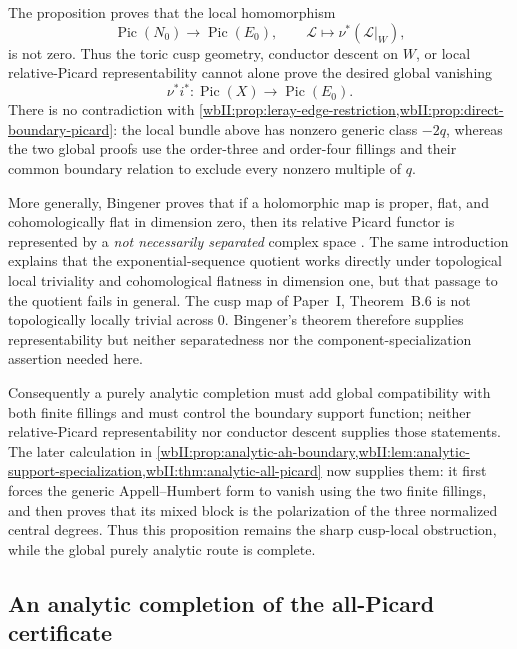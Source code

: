 \begin{remark}
\label{wbII:rem:local-cusp-picard-obstruction}
The proposition proves that the local homomorphism
\[
 \operatorname{Pic}(N_0)\longrightarrow\operatorname{Pic}(E_0),
 \qquad
 \mathcal L\longmapsto\nu^*(\mathcal L|_W),
\]
is not zero.  Thus the toric cusp geometry, conductor descent on \(W\),
or local relative-Picard representability cannot alone prove the desired
global vanishing
\[
 \nu^*i^*:\operatorname{Pic}(X)\longrightarrow
 \operatorname{Pic}(E_0).
\]
There is no contradiction with
\cref{wbII:prop:leray-edge-restriction,wbII:prop:direct-boundary-picard}: the local
bundle above has nonzero generic class \(-2q\), whereas the two global
proofs use the order-three and order-four fillings and their common
boundary relation to exclude every nonzero multiple of \(q\).

More generally, Bingener proves that if a holomorphic map is proper,
flat, and cohomologically flat in dimension zero, then its relative
Picard functor is represented by a \emph{not necessarily separated}
complex space
\cite[Introduction, p.~318; Satz~6.2, pp.~336--337]{Bingener1980}.
The same introduction explains that the exponential-sequence quotient
works directly under topological local triviality and cohomological
flatness in dimension one, but that passage to the quotient fails in
general.  The cusp map of Paper~I, Theorem~B.6 is not
topologically locally trivial across \(0\).  Bingener's theorem therefore
supplies representability but neither separatedness nor the
component-specialization assertion needed here.

Consequently a purely analytic completion must add global compatibility
with both finite fillings and must control the boundary support function;
neither relative-Picard representability nor conductor descent supplies
those statements.  The later calculation in
\cref{wbII:prop:analytic-ah-boundary,wbII:lem:analytic-support-specialization,wbII:thm:analytic-all-picard} now supplies them: it first forces the generic
Appell--Humbert form to vanish using the two finite fillings, and then
proves that its mixed block is the polarization of the three normalized
central degrees.  Thus this proposition remains the sharp cusp-local
obstruction, while the global purely analytic route is complete.
\end{remark}


\subsection{An analytic completion of the all-Picard certificate}
\label{wbII:subsec:analytic-all-picard}


